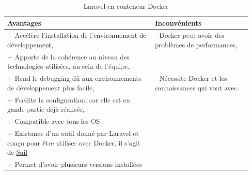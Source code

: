 \documentclass[
    iai, %
    il, %
]{heig-tb}
\begin{document}
\begin{table}[h]
    \begin{center}
        \caption{Laravel en conteneur Docker \label{dev-laravel-docker}}
        \begin{tabularx}{1.0\textwidth} {X|X}
            Avantages                                                                                                                   & Inconvénients
            \\ \hline
            + Accélère l'installation de l'environnement de développement, \cite{labrecque}                                             & - Docker peut avoir des problèmes de performances, \cite{labrecque}     \\
            + Apporte de la cohérence au niveau des technologies utilisées, au sein de l'équipe, \cite{labrecque, data-flair-use-cases} &                                                                         \\
            + Rend le debugging dû aux environnements de développement plus facile, \cite{labrecque,koukia}                             & - Nécessite Docker et les connaissances qui vont avec. \cite{labrecque} \\
            + Facilite la configuration, car elle est en gande partie déjà réalisée, \cite{data-flair-pros-cons}                        &                                                                         \\
            + Compatible avec tous les OS                                                                                               &                                                                         \\
            + Existance d'un outil donné par Laravel et conçu pour être utiliser avec Docker, il
            s'agit de \href{https://laravel.com/docs/9.x/sail}{Sail}
                                                                                                                                        &                                                                         \\
            + Permet d'avoir plusieurs versions installées                                                                              &                                                                         \\
        \end{tabularx}
    \end{center}
\end{table}
\end{document}

